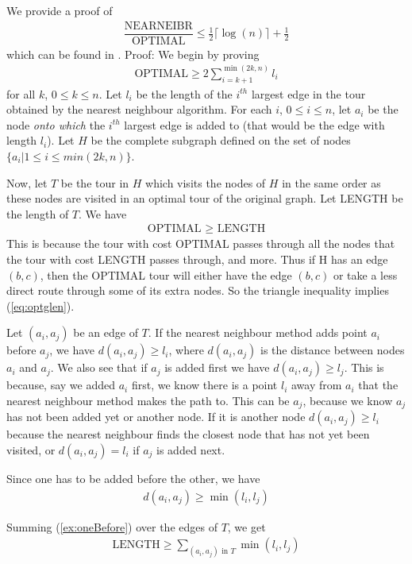 We provide a proof of
\begin{align}
\dfrac{\text{NEARNEIBR}}{\text{OPTIMAL}} \leq \frac{1}{2} \lceil \log(n) \rceil + \frac{1}{2}
\end{align}
which can be found in \cite{rosenkrantz74}. 
Proof:
We begin by proving 
\begin{align}
\text{OPTIMAL} \geq 2 \sum^{\min(2k,n)}_{i=k+1} l_i \label{eq:showFirst}
\end{align}
for all $k$, $0\leq k \leq n$. 
Let $l_i$ be the length of the $i^{th}$ largest edge in the tour obtained by the nearest neighbour algorithm. For each $i$, $0 \leq i \leq n$, let $a_i$ be the node \textit{onto which} the $i^{th}$ largest edge is added to (that would be the edge with length $l_i$). Let $H$ be the complete subgraph defined on the set of nodes $\{a_i | 1 \leq i \leq min(2k,n)\}$.

Now, let $T$ be the tour in $H$ which visits the nodes of $H$ in the same order as these nodes are visited in an optimal tour of the original graph. Let LENGTH be the length of $T$. We have 
\begin{align}
\text{OPTIMAL $\geq$ LENGTH} \label{eq:optglen}
\end{align}
This is because the tour with cost OPTIMAL passes through all the nodes that the tour with cost LENGTH passes through, and more. Thus if H has an edge $(b,c)$, then the OPTIMAL tour will either have the edge $(b,c)$ or take a less direct route through some of its extra nodes. So the triangle inequality implies (\ref{eq:optglen}).  
   
Let $(a_i,a_j)$ be an edge of $T$. If the nearest neighbour method adds point $a_i$ before $a_j$, we have $d(a_i,a_j) \geq l_i$, where $d(a_i,a_j)$ is the distance between nodes $a_i$ and $a_j$. We also see that if $a_j$ is added first we have $d(a_i, a_j) \geq l_j$. This is because, say we added $a_i$ first, we know there is a point $l_i$ away from $a_i$ that the nearest neighbour method makes the path to. This can be $a_j$, because we know $a_j$ has not been added yet or another node. If it is another node $d(a_i, a_j) \geq l_i$ because the nearest neighbour finds the closest node that has not yet been visited, or $d(a_i, a_j) = l_i$ if $a_j$ is added next. 

Since one has to be added before the other, we have 
\begin{align}
d(a_i , a_j) \geq \min(l_i, l_j) \label{ex:oneBefore}
\end{align}

Summing (\ref{ex:oneBefore}) over the edges of $T$, we get
\begin{align}
\text{LENGTH} \geq \sum_{(a_i,a_j) \text{ in } T} \min(l_i,l_j)  \label{eq:lengmin}
\end{align}

